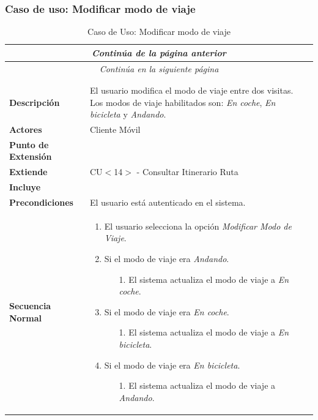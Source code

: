 \subsubsection*{Caso de uso: Modificar modo de viaje }
\begin{longtable}{| p{4cm} | p{10cm} |}
\endfirsthead
\multicolumn{2}{c}{\textit{Continúa de la página anterior}}\\[12pt]
\hline
\endhead
\hline
\multicolumn{2}{c}{\textit{Continúa en la siguiente página}} \\
\endfoot
\hline
\caption{Caso de Uso: Modificar modo de viaje}\label{fig:1}\\
\endlastfoot


\hline
\multicolumn{2}{|c|}{\textbf{CU$<$19$>$ - Modificar Modo de Viaje}} \\

\hline
\textbf{Descripción} &
El usuario modifica el modo de viaje entre dos visitas. Los modos de viaje habilitados son: \textit{En coche}, \textit{En bicicleta} y \textit{Andando}.\\

\hline
\textbf{Actores} &
Cliente Móvil\\

\hline
\textbf{Punto de Extensión} &
\\

\hline
\textbf{Extiende} &
CU$<$14$>$ - Consultar Itinerario Ruta
\\

\hline
\textbf{Incluye} &
\\

\hline
\textbf{Precondiciones} &
El usuario está autenticado en el sistema.\\

\hline
\textbf{Secuencia Normal} &\mbox{}\par\vspace{-\baselineskip}
\begin{enumerate}[leftmargin=0.7cm, topsep=0.1cm]
\item El usuario selecciona la opción \textit{Modificar Modo de Viaje}.
\item Si el modo de viaje era \textit{Andando}.
	\begin{itemize}
	\item [1.] El sistema actualiza el modo de viaje a \textit{En coche}.
	\end{itemize}
\item Si el modo de viaje era \textit{En coche}.
	\begin{itemize}
	\item [1.] El sistema actualiza el modo de viaje a \textit{En bicicleta}.
	\end{itemize}
\item Si el modo de viaje era \textit{En bicicleta}.
	\begin{itemize}
	\item [1.] El sistema actualiza el modo de viaje a \textit{Andando}.
	\end{itemize}


\end{enumerate}
\end{longtable}
